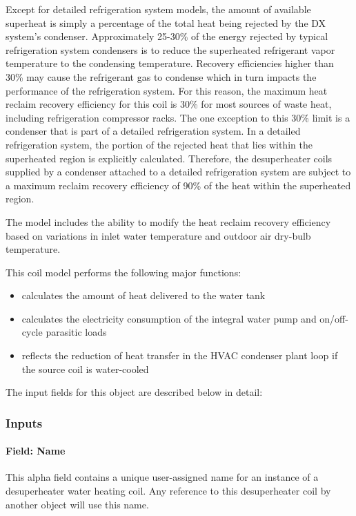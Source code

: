 Except for detailed refrigeration system models, the amount of available superheat is simply a percentage of the total heat being rejected by the DX system's condenser. Approximately 25-30\% of the energy rejected by typical refrigeration system condensers is to reduce the superheated refrigerant vapor temperature to the condensing temperature. Recovery efficiencies higher than 30\% may cause the refrigerant gas to condense which in turn impacts the performance of the refrigeration system. For this reason, the maximum heat reclaim recovery efficiency for this coil is 30\% for most sources of waste heat, including refrigeration compressor racks. The one exception to this 30\% limit is a condenser that is part of a detailed refrigeration system. In a detailed refrigeration system, the portion of the rejected heat that lies within the superheated region is explicitly calculated. Therefore, the desuperheater coils supplied by a condenser attached to a detailed refrigeration system are subject to a maximum reclaim recovery efficiency of 90\% of the heat within the superheated region.

The model includes the ability to modify the heat reclaim recovery efficiency based on variations in inlet water temperature and outdoor air dry-bulb temperature.

This coil model performs the following major functions:

\begin{itemize}
\item
  calculates the amount of heat delivered to the water tank
\item
  calculates the electricity consumption of the integral water pump and on/off-cycle parasitic loads
\item
  reflects the reduction of heat transfer in the HVAC condenser plant loop if the source coil is water-cooled
\end{itemize}

The input fields for this object are described below in detail:

\subsubsection{Inputs}\label{inputs-22-000}

\paragraph{Field: Name}\label{field-name-21-000}

This alpha field contains a unique user-assigned name for an instance of a desuperheater water heating coil. Any reference to this desuperheater coil by another object will use this name.

